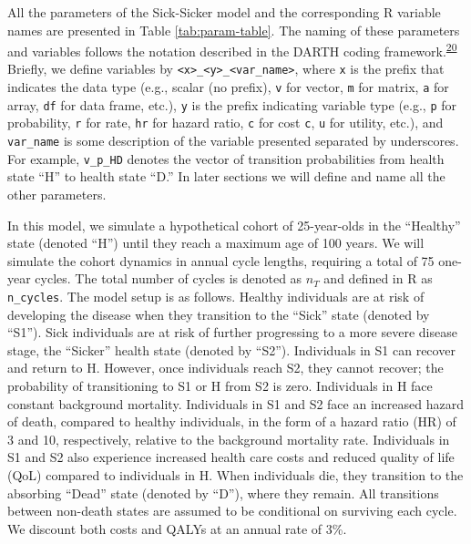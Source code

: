 \documentclass[
]{article}
\begin{document}
All the parameters of the Sick-Sicker model and the corresponding R variable names are presented in Table \ref{tab:param-table}. The naming of these parameters and variables follows the notation described in the DARTH coding framework.\textsuperscript{\protect\hyperlink{ref-Alarid-Escudero2019e}{20}} Briefly, we define variables by \texttt{\textless{}x\textgreater{}\_\textless{}y\textgreater{}\_\textless{}var\_name\textgreater{}}, where \texttt{x} is the prefix that indicates the data type (e.g., scalar (no prefix), \texttt{v} for vector, \texttt{m} for matrix, \texttt{a} for array, \texttt{df} for data frame, etc.), \texttt{y} is the prefix indicating variable type (e.g., \texttt{p} for probability, \texttt{r} for rate, \texttt{hr} for hazard ratio, \texttt{c} for cost \texttt{c}, \texttt{u} for utility, etc.), and \texttt{var\_name} is some description of the variable presented separated by underscores. For example, \texttt{v\_p\_HD} denotes the vector of transition probabilities from health state ``H'' to health state ``D.'' In later sections we will define and name all the other parameters.

In this model, we simulate a hypothetical cohort of 25-year-olds in the ``Healthy'' state (denoted ``H'') until they reach a maximum age of 100 years. We will simulate the cohort dynamics in annual cycle lengths, requiring a total of 75 one-year cycles. The total number of cycles is denoted as \(n_T\) and defined in R as \texttt{n\_cycles}. The model setup is as follows. Healthy individuals are at risk of developing the disease when they transition to the ``Sick'' state (denoted by ``S1''). Sick individuals are at risk of further progressing to a more severe disease stage, the ``Sicker'' health state (denoted by ``S2''). Individuals in S1 can recover and return to H. However, once individuals reach S2, they cannot recover; the probability of transitioning to S1 or H from S2 is zero. Individuals in H face constant background mortality. Individuals in S1 and S2 face an increased hazard of death, compared to healthy individuals, in the form of a hazard ratio (HR) of 3 and 10, respectively, relative to the background mortality rate. Individuals in S1 and S2 also experience increased health care costs and reduced quality of life (QoL) compared to individuals in H. When individuals die, they transition to the absorbing ``Dead'' state (denoted by ``D''), where they remain. All transitions between non-death states are assumed to be conditional on surviving each cycle. We discount both costs and QALYs at an annual rate of 3\%.
\end{document}
